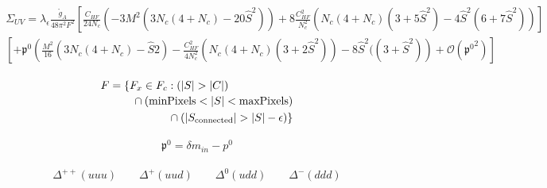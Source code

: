 \documentclass{article}
\newcommand{\bea}{\begin{eqnarray}}
\newcommand{\eea}{\end{eqnarray}}
\begin{document}
\bea
\begin{multlined}
\Sigma_{UV}=  \lambda_\epsilon  \frac{\mathring{g}_A}{48\pi^2F^2} 
	 \left[   \frac{C_{HF}}{24N_c} 	\left(  -3M^2 (3N_c (4+N_c) -20 \hat{S}^2  )   \right) 
		+ 8 \frac{C_{HF}^2}{N_c^2} (N_c(4+N_c)(3+5 \hat{S}^2) -4 \hat{S}^2(6+7 \hat{S}^2) ) \right ] \\	
	\left[	+ \mathfrak{p^0} \left( \frac{M^2}{16} (3N_c (4+N_c)-\hat{S}2)
		- \frac{C_{HF}^2}{4N_c^2}(N_c(4+N_c)(3+2 \hat{S}^2))
		-8	\hat{S}^2 ((3+\hat{S}^2)  \right) + \mathcal{O} \left( \mathfrak{p^0}^2 \right)
	\right ]
\end{multlined}
\eea



\begin{equation}
\begin{multlined}
F = \{F_{x} \in  F_{c} : (|S| > |C|) \\
\shoveleft[1cm]{\cap (\mathrm{minPixels}  < |S| < \mathrm{maxPixels})} \\
\cap (|S_{\mathrm{connected}}| > |S| - \epsilon) \}
\end{multlined}
\end{equation}


\bea
 \mathfrak{p^0}=\delta m_{in}-p^0
\eea

\bea
\Delta^{++}\left( uuu \right) \qquad \Delta^{+}\left( uud \right) \qquad \Delta^{0}\left( udd \right) \qquad \Delta^{-}\left( ddd \right)
\eea

\newpage


 
%
\end{document}
